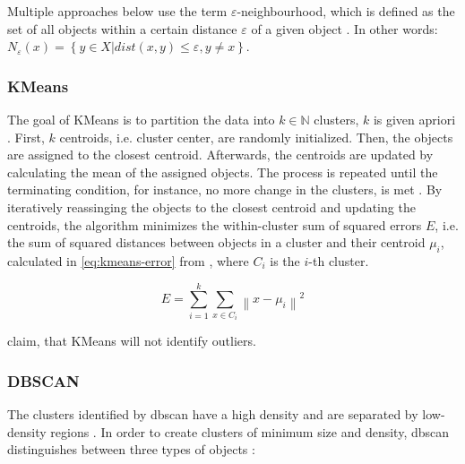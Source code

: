Multiple approaches below use the term $\varepsilon$-neighbourhood, which is defined as the set of all objects within a certain distance $\varepsilon$ of a given object \cite{OPTICS2013}.
In other words: $N_\varepsilon (x) = \left\{ y \in X | dist(x,y) \le \varepsilon, y \neq x \right\}$.


\subsubsection{KMeans}\label{subsec:kmeans}

The goal of KMeans is to partition the data into $k \in \mathbb{N}$  clusters, $k$ is given apriori \cite{OPTICS_kMeans_2016}. %
First, $k$ centroids, i.e. cluster center, are randomly initialized.
Then, the objects are assigned to the closest centroid.
Afterwards, the centroids are updated by calculating the mean of the assigned objects.
The process is repeated until the terminating condition, for instance, no more change in the clusters, is met \cite{OPTICS_kMeans_2016}.
By iteratively reassinging the objects to the closest centroid and updating the centroids, 
the algorithm minimizes the within-cluster sum of squared errors $E$, i.e. the sum of squared distances between objects in a cluster and their centroid $\mu_{i}$, 
calculated in \autoref{eq:kmeans-error} from \cite{OPTICS_kMeans_2016}, 
where $C_{i}$ is the $i$-th cluster.

\begin{equation}
    E = \sum_{i=1}^{k} \sum_{x \in C_{i}}\left\|x-\mu_{i}\right\|^{2}
\label{eq:kmeans-error}
\end{equation}

\citeauthor{OPTICS_kMeans_2016} claim, that KMeans will not identify outliers.


\subsubsection{DBSCAN}\label{subsec:dbscan}

The clusters identified by \ac{dbscan} have a high density and are separated by low-density regions \cite{OPTICS_kMeans_2016}.
In order to create clusters of minimum size and density, \ac{dbscan} distinguishes between three types of objects \cite{OPTICS_kMeans_2016}:

